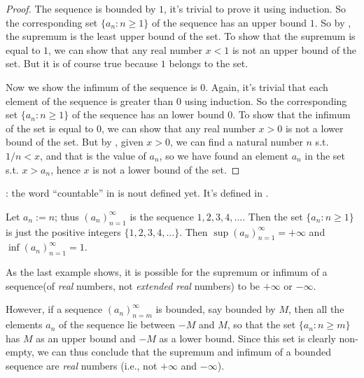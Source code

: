 \begin{proof}
The sequence is bounded by \(1\), it's trivial to prove it using induction.
So the corresponding set \(\{a_n : n \ge 1\}\) of the sequence has an upper bound \(1\).
So by , the supremum is the least upper bound of the set.
To show that the supremum is equal to \(1\), we can show that any real number \(x < 1\) is not an upper bound of the set.
But it is of course true because \(1\) belongs to the set.

Now we show the infimum of the sequence is \(0\).
Again, it's trivial that each element of the sequence is greater than \(0\) using induction.
So the corresponding set \(\{a_n : n \ge 1\}\) of the sequence has an lower bound \(0\).
To show that the infimum of the set is equal to \(0\), we can show that any real number \(x > 0\) is not a lower bound of the set.
But by , given \(x > 0\), we can find a natural number \(n\) s.t. \(1/n < x\), and that is the value of \(a_n\), so we have found an element \(a_n\) in the set s.t. \(x > a_n\), hence \(x\) is not a lower bound of the set.
\end{proof}

\begin{note}
: the word ``countable'' in  is nout defined yet.
It's defined in .
\end{note}

\begin{example} \label{example 6.3.5}
Let \(a_n := n\); thus \((a_n)_{n = 1}^{\infty}\) is the sequence \(1, 2, 3, 4,...\).
Then the set \(\{a_n : n \ge 1\}\) is just the positive integers \(\{1, 2, 3, 4,...\}\).
Then \(\sup(a_n)_{n = 1}^{\infty} = +\infty\) and \(\inf(a_n)_{n = 1}^{\infty} = 1\).
\end{example}

As the last example shows, it is possible for the supremum or infimum of a sequence(of \emph{real} numbers, not \emph{extended real} numbers) to be \(+\infty\) or \(-\infty\).

\begin{additional corollary} \label{ac 6.3.1}
However, if a sequence \((a_n)_{n = m}^{\infty}\) is
bounded, say bounded by \(M\), then all the elements \(a_n\) of the sequence lie between \(-M\) and \(M\), so that the set \(\{a_n : n \ge m\}\) has \(M\) as an upper bound and \(-M\) as a lower bound.
Since this set is clearly non-empty, we can thus conclude that the supremum and infimum of a bounded sequence are \emph{real} numbers (i.e., not \(+\infty\) and \(-\infty\)).
\end{additional corollary}

